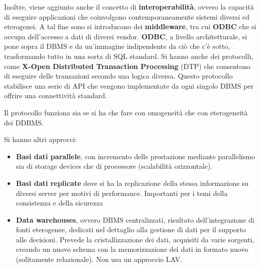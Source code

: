 Inoltre, viene aggiunto anche il concetto di \textbf{interoperabilità}, ovvero
la capacità di eseguire applicazioni che coinvolgono contemporaneamente sistemi
diversi ed eterogenei. A tal fine sono si introducono dei \textbf{middleware},
tra cui \textbf{ODBC} che si occupa dell'accesso a dati di diversi vendor.
\textbf{ODBC}, a livello architetturale, si pone sopra il DBMS e da un'immagine
indipendente da ciò che c'è sotto, trasformando tutto in una sorta di SQL standard.
Si hanno anche dei protocolli, come \textbf{X-Open Distributed Transaction Processing}
(DTP) che consentono di eseguire delle transazioni secondo
una logica diversa. Questo protocollo stabilisce una serie di API che vengono
implementate da ogni singolo DBMS per offrire una connettività standard.

Il protocollo funziona sia se si ha che fare con omogeneità che con eterogeneità
dei DDBMS.

Si hanno altri approcci:
\begin{itemize}
      \item \textbf{Basi dati parallele}, con incremento delle prestazione
            mediante parallelismo sia di storage devices che di processore
            (scalabilità orizzontale).
      \item \textbf{Basi dati replicate} dove si ha la replicazione della stessa
            informazione su diversi server per motivi di performance. Importanti
            per i temi della consistenza e della sicurezza
      \item \textbf{Data warehouses}, ovvero DBMS centralizzati, risultato
            dell'integrazione di fonti eterogenee, dedicati nel dettaglio alla
            gestione di dati per il supporto alle decisioni. Prevede la
            cristallizzazione dei dati, acquisiti da varie sorgenti, creando un
            nuovo schema con la memorizzazione dei dati in formato nuovo
            (solitamente relazionale). Non usa un approccio LAV.
\end{itemize}
